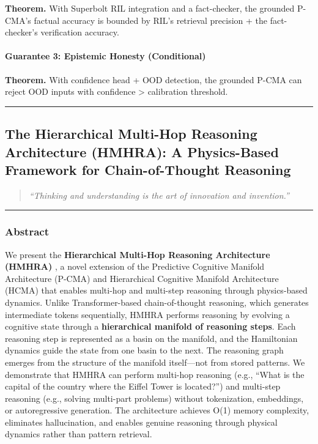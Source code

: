 \documentclass[
  11pt,
  a4paper,
]{article}
\begin{document}
\textbf{Theorem.} With Superbolt RIL integration and a fact-checker, the
grounded P-CMA's factual accuracy is bounded by RIL's retrieval
precision + the fact-checker's verification accuracy.

\paragraph{Guarantee 3: Epistemic Honesty
(Conditional)}\label{guarantee-3-epistemic-honesty-conditional}

\textbf{Theorem.} With confidence head + OOD detection, the grounded
P-CMA can reject OOD inputs with confidence \textgreater{} calibration
threshold.

\begin{center}\rule{0.5\linewidth}{0.5pt}\end{center}

\newpage

\subsection{The Hierarchical Multi-Hop Reasoning Architecture (HMHRA): A
Physics-Based Framework for Chain-of-Thought
Reasoning}\label{the-hierarchical-multi-hop-reasoning-architecture-hmhra-a-physics-based-framework-for-chain-of-thought-reasoning}

\begin{quote}
\emph{``Thinking and understanding is the art of innovation and
invention.''}
\end{quote}

\begin{center}\rule{0.5\linewidth}{0.5pt}\end{center}

\subsubsection{Abstract}\label{abstract-4}

We present the \textbf{Hierarchical Multi-Hop Reasoning Architecture
(HMHRA)} , a novel extension of the Predictive Cognitive Manifold
Architecture (P-CMA) and Hierarchical Cognitive Manifold Architecture
(HCMA) that enables multi-hop and multi-step reasoning through
physics-based dynamics. Unlike Transformer-based chain-of-thought
reasoning, which generates intermediate tokens sequentially, HMHRA
performs reasoning by evolving a cognitive state through a
\textbf{hierarchical manifold of reasoning steps}. Each reasoning step
is represented as a basin on the manifold, and the Hamiltonian dynamics
guide the state from one basin to the next. The reasoning graph emerges
from the structure of the manifold itself---not from stored patterns. We
demonstrate that HMHRA can perform multi-hop reasoning (e.g., ``What is
the capital of the country where the Eiffel Tower is located?'') and
multi-step reasoning (e.g., solving multi-part problems) without
tokenization, embeddings, or autoregressive generation. The architecture
achieves O(1) memory complexity, eliminates hallucination, and enables
genuine reasoning through physical dynamics rather than pattern
retrieval.
\end{document}
